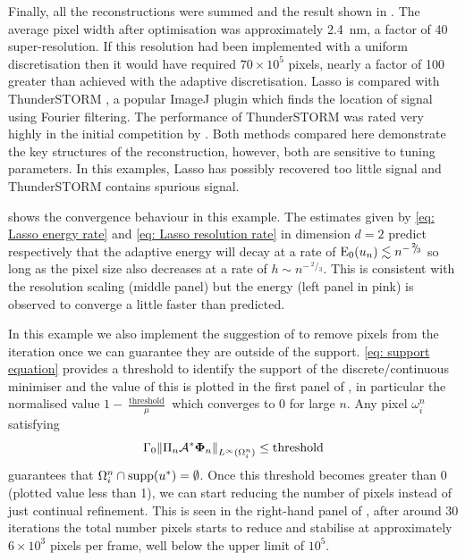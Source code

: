 \documentclass[10pt,a4paper,onecolumn]{article}
\numberwithin{equation}{section}
\newcommand{\norm}[1]{{\left\lVert #1 \right\rVert}}
\renewcommand{\sfrac}[2]{\,^{#1}\!\!/\!_{#2}}
\newcommand{\op}[1]{\operatorname{#1}}\newcommand{\overtext}[2]{\stackrel{\text{#1}}{#2}}
\renewcommand{\vec}{\mathbf}
\newcommand*{\Func}[1]{%
	\IfEqCase{#1}{%
		{0}{\op{E}}%
		{1}{\op{F}}%
		{2}{\op{G}}%
		{3}{\op{H}}%
	}[\op{F}#1]%
}
\newcommand*{\varf}[1]{%
	\IfEqCase{#1}{%
		{0}{u}%
		{1}{v}%
		{2}{w}%
	}[u#1]%
}
\newcommand*{\vard}[1]{%
	\IfEqCase{#1}{%
		{0}{\varphi}%
		{1}{\psi}%
	}[\varphi #1]%
}
\newcommand*{\vars}[1]{%
	\IfEqCase{#1}{%
		{0}{\alpha}%
		{1}{\beta}%
		{2}{\gamma}%
		{3}{a}%
		{4}{b}%
		{5}{c}%
	}[k#1]%
}
\newcommand*{\data}[1]{%
	\IfEqCase{#1}{%
		{0}{\eta}%
		{1}{\nu}%
	}[g]%
}
\newcommand{\domain}{\omega}
\newcommand{\meshsize}{h}
\newcommand*{\vvard}[1]{\vec{\vard{#1}}}\newcommand*{\vdata}[1]{\vec{\data{#1}}}
\begin{document}
Finally, all the reconstructions were summed and the result shown in . The average pixel width after optimisation was approximately \SI{2.4}{\nano\meter}, a factor of 40 super-resolution. If this resolution had been implemented with a uniform discretisation then it would have required $70\times 10^5$ pixels, nearly a factor of 100 greater than achieved with the adaptive discretisation. Lasso is compared with ThunderSTORM \citep{Ovesny2014}, a popular ImageJ plugin \citep{Schindelin2012} which finds the location of signal using Fourier filtering. The performance of ThunderSTORM was rated very highly in the initial competition by \citet{Sage2015}. Both methods compared here demonstrate the key structures of the reconstruction, however, both are sensitive to tuning parameters. In this examples, Lasso has possibly recovered too little signal and ThunderSTORM contains spurious signal. 

 shows the convergence behaviour in this example. The estimates given by \eqref{eq: Lasso energy rate} and \eqref{eq: Lasso resolution rate} in dimension $d=2$ predict respectively that the adaptive energy will decay at a rate of $\Func0_0(\varf0_n)\lesssim n^{-\sfrac23}$ so long as the pixel size also decreases at a rate of $\meshsize\sim n^{-\sfrac23}$. This is consistent with the resolution scaling (middle panel) but the energy (left panel in pink) is observed to converge a little faster than predicted. 

In this example we also implement the suggestion of  to remove pixels from the iteration once we can guarantee they are outside of the support. \eqref{eq: support equation} provides a threshold to identify the support of the discrete/continuous minimiser and the value of this is plotted in the first panel of , in particular the normalised value $1-\frac{\op{threshold}}{\mu}$ which converges to 0 for large $n$. Any pixel $\domain_i^n$ satisfying 
\begin{equation}
	 \vars2_0\norm{\Pi_n\A^*\vvard0_n}_{L^\infty(\domain_i^n)} \leq \op{threshold}
\end{equation}
guarantees that $\domain_i^n\cap\op{supp}(\varf0^*) = \emptyset$. Once this threshold becomes greater than 0 (plotted value less than 1), we can start reducing the number of pixels instead of just continual refinement. This is seen in the right-hand panel of , after around 30 iterations the total number pixels starts to reduce and stabilise at approximately $6\times10^3$ pixels per frame, well below the upper limit of $10^5$.
\end{document}
